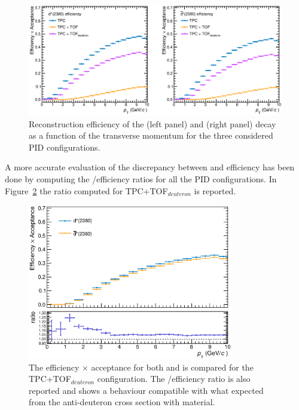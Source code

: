 \begin{figure}
    \centering
    \includegraphics[width=\textwidth]{gfx/eff3globalSLIM}
	\caption{Reconstruction efficiency of the \ds (left panel) and \dsbar (right panel) decay as a function of the transverse momentum for the three considered PID configurations.}
	\label{fig:effAM}
\end{figure}

A more accurate evaluation of the discrepancy between \ds and \dsbar efficiency has been done
by computing the \ds/\dsbar efficiency ratios for all the PID configurations.
In Figure~\ref{fig:eff_ratioAM} the ratio computed for TPC+TOF$_{deuteron}$ is reported.

\begin{figure} [!h]
    \centering
    \includegraphics[width=0.8\textwidth]{gfx/eff_ratioAM1SLIM}
	\caption{The efficiency $\times$ acceptance for both \ds and \dsbar is compared for the TPC+TOF$_{deuteron}$ configuration. The \ds/\dsbar efficiency ratio is also reported and shows a behaviour compatible with what expected from the anti-deuteron cross section with material.}
	\label{fig:eff_ratioAM}
\end{figure}


